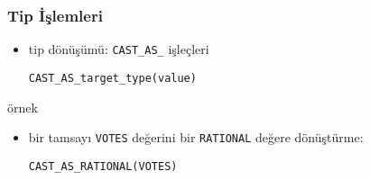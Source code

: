 \documentclass[dvipsnames]{beamer}
\theoremstyle{plain}
\begin{document}
\begin{frame}[fragile]
  \frametitle{Tip İşlemleri}

  \begin{itemize}
    \item tip dönüşümü: \lstinline!CAST_AS_! işleçleri
    \begin{lstlisting}
CAST_AS_target_type(value)
    \end{lstlisting}
  \end{itemize}

  \medskip
  \begin{exampleblock}{örnek}
    \begin{itemize}
      \item bir tamsayı \texttt{VOTES} değerini bir \texttt{RATIONAL} değere
        dönüştürme:
      \begin{lstlisting}
CAST_AS_RATIONAL(VOTES)
      \end{lstlisting}
    \end{itemize}
  \end{exampleblock}
\end{frame}

%
%
%
\end{document}
